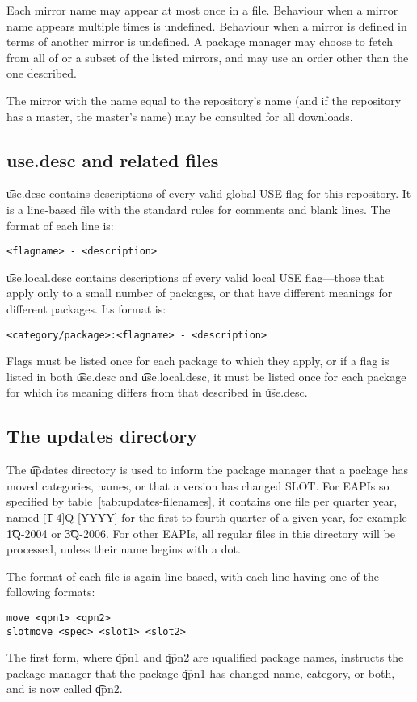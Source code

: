 Each mirror name may appear at most once in a file. Behaviour when a mirror name appears multiple
times is undefined. Behaviour when a mirror is defined in terms of another mirror is undefined. A
package manager may choose to fetch from all of or a subset of the listed mirrors, and may use an
order other than the one described.

The mirror with the name equal to the repository's name (and if the repository has a master,
the master's name) may be consulted for all downloads.

\subsection{use.desc and related files}
\label{sec:use.desc}
\t{use.desc} contains descriptions of every valid global USE flag for this repository. It is a
line-based file with the standard rules for comments and blank lines. The format of each line is:
\begin{verbatim}
<flagname> - <description>
\end{verbatim}

\t{use.local.desc} contains descriptions of every valid local USE flag---those that apply only to a
small number of packages, or that have different meanings for different packages. Its format is:
\begin{verbatim}
<category/package>:<flagname> - <description>
\end{verbatim}
Flags must be listed once for each package to which they apply, or if a flag is listed in both
\t{use.desc} and \t{use.local.desc}, it must be listed once for each package for which its meaning
differs from that described in \t{use.desc}.

\subsection{The updates directory}
\label{sec:updates-dir}
 The \t{updates} directory is used to inform the package manager
that a package has moved categories, names, or that a version has changed SLOT\@. For EAPIs
so specified by table~\ref{tab:updates-filenames}, it contains one file per quarter year, named
\t{[1-4]Q-[YYYY]} for the first to fourth quarter of a given year, for example \t{1Q-2004} or
\t{3Q-2006}. For other EAPIs, all regular files in this directory will be processed, unless their
name begins with a dot.

The format of each file is again line-based, with each line having one of the following formats:
\begin{verbatim}
move <qpn1> <qpn2>
slotmove <spec> <slot1> <slot2>
\end{verbatim}
The first form, where \t{qpn1} and \t{qpn2} are \i{qualified package names}, instructs the package
manager that the package \t{qpn1} has changed name, category, or both, and is now called \t{qpn2}.


